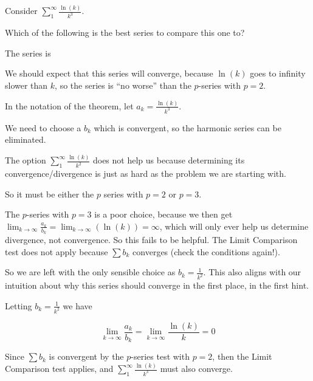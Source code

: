 \documentclass{ximera}
\begin{document}
\begin{question}
	Consider $\sum_1^\infty \frac{\ln(k)}{k^3}$.
	
	Which of the following is the best series to compare this one to?
	
	\begin{multipleChoice}
	\end{multipleChoice}
	
	The series is
	
	\begin{multipleChoice}
		\choice[correct]{convergent}
		\choice{divergent}
	\end{multipleChoice}
	
	\begin{hint}
		We should expect that this series will converge, because $\ln(k)$ goes to infinity slower than $k$, so the series is ``no worse'' than the $p$-series with $p=2$.
	\end{hint}
	
	\begin{hint}
		In the notation of the theorem, let $a_k = \frac{\ln(k)}{k^3}$.
		
		We need to choose a $b_k$ which is convergent, so the harmonic series can be eliminated.
		
		The option $\sum_1^\infty \frac{\ln(k)}{k^2}$ does not help us because determining its convergence/divergence is just as hard as the problem we are starting with.
		
		So it must be either the $p$ series with $p=2$ or $p=3$.
		
		The $p$-series with $p=3$ is a poor choice, because we then get $\lim_{k \to \infty} \frac{a_k}{b_k} = \lim_{k \to \infty} (\ln(k)) = \infty$, which will only ever help us determine divergence, not convergence.  So this fails to be helpful.  The Limit Comparison test does not apply because $\sum b_k$ converges (check the conditions again!).
		
		So we are left with the only sensible choice as $b_k = \frac{1}{k^2}$.  This also aligns with our intuition about why this series should converge in the first place, in the first hint.
	\end{hint}
	
	\begin{hint}
		Letting $b_k = \frac{1}{k^2}$ we have
		
		\[
		\lim_{k \to \infty} \frac{a_k}{b_k} = \lim_{k \to \infty} \frac{\ln(k)}{k} = 0
		\]
		
		Since $\sum b_k$ is convergent by the $p$-series test with $p=2$, then the Limit Comparison test applies, and $\sum_1^\infty \frac{\ln(k)}{k^3}$ must also converge.
	\end{hint}
\end{question}
\end{document}
